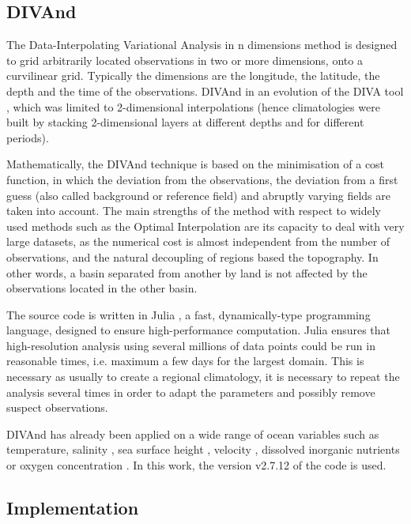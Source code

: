 \documentclass[essd,manuscript]{copernicus}
\begin{document}
\subsection{DIVAnd\label{sec:divandmethod}}

The Data-Interpolating Variational Analysis in n dimensions method \citep[DIVAnd][]{BARTH2014} is designed to grid arbitrarily located observations in two or more dimensions, onto a curvilinear grid. Typically the dimensions are the longitude, the latitude, the depth and the time of the observations. DIVAnd in an evolution of the DIVA tool \citep{TROUPIN2012,BECKERS2014}, which was limited to 2-dimensional interpolations (hence climatologies were built by stacking 2-dimensional layers at different depths and for different periods). 

Mathematically, the DIVAnd technique is based on the minimisation of a cost function, in which the deviation from the observations, the deviation from a first guess (also called background or reference field) and abruptly varying fields are taken into account. The main strengths of the method with respect to widely used methods such as the Optimal Interpolation \citep[OI,][]{GANDIN1966,BRETHERTON1976} are its capacity to deal with very large datasets, as the numerical cost is almost independent from the number of observations, and the natural decoupling of regions based the topography. In other words, a basin separated from another by land is not affected by the observations located in the other basin.

The source code is written in Julia \citep{Bezanson2017}, a fast, dynamically-type programming language, designed to ensure high-performance computation. Julia ensures that high-resolution analysis using several millions of data points could be run in reasonable times, i.e. maximum a few days for the largest domain. This is necessary as usually to create a regional climatology, it is necessary to repeat the analysis several times in order to adapt the parameters and possibly remove suspect observations.

DIVAnd has already been applied on a wide range of ocean variables such as temperature, salinity \citep{COATANOAN2021}, sea surface height \citep{DOGLIONI2023}, velocity \citep{TROUPIN2022}, dissolved inorganic nutrients \citep{BELGACEM2021} or oxygen concentration \citep{CLIMATO2023}. In this work, the version v2.7.12 of the code \citep{BARTH2024DIVAnd} is used.

\subsection{Implementation}
\end{document}

